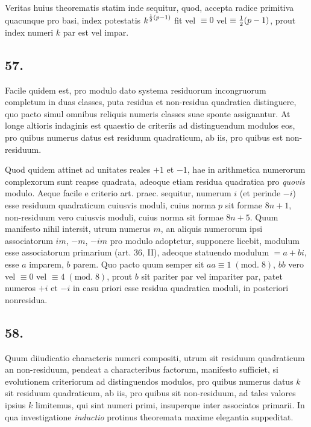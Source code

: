 \documentclass[twoside,12pt, showframe]{memoir}
\renewcommand{\pmod}[1]{\;(\textrm{mod.}\;#1)}
\let\oldfrac\frac
\def\frac#1#2{\mathchoice{\tfrac{#1}{#2}}{\oldfrac{#1}{#2}}{\genfrac{}{}{}{2}{#1}{#2\mathstrut}}{\genfrac{}{}{}{3}{#1}{#2\mathstrut}}}
\begin{document}
Veritas huius theorematis statim inde sequitur, quod, accepta radice primitiva quacunque pro basi, index potestatis \(k^{\frac{1}{2}(p-1)}\) fit vel \(\equiv 0\) vel \(\equiv \frac{1}{2}(p-1)\), prout index numeri \(k\) par est vel impar.

\subsection*{57.}
 
Facile quidem est, pro modulo dato systema residuorum incongruorum completum in duas classes, puta residua et non-residua quadratica distinguere, quo pacto simul omnibus reliquis numeris classes suae sponte assignantur. At longe altioris indaginis est quaestio de criteriis ad distinguendum modulos eos, pro quibus numerus datus est residuum quadraticum, ab iis, pro quibus est non-residuum.
 
Quod quidem attinet ad unitates reales \(+1\) et \(-1\), hae in arithmetica numerorum complexorum sunt reapse quadrata, adeoque etiam residua quadratica pro \textit{quovis} modulo. Aeque facile e criterio art. praec. sequitur, numerum \(i\) (et perinde \(-i\)) esse residuum quadraticum cuiusvis moduli, cuius norma \(p\) sit formae \(8 n+1\), non-residuum vero cuiusvis moduli, cuius norma sit formae \(8 n+5\). Quum manifesto nihil intersit, utrum numerus \(m\), an aliquis numerorum ipsi associatorum \(i m\), \(-m\), \(-i m\) pro modulo adoptetur, supponere licebit, modulum esse associatorum primarium (art. 36, II), adeoque statuendo modulum \(=a+b i\), esse \(a\) imparem, \(b\) parem. Quo pacto quum semper sit \(a a \equiv 1\pmod{8}\), \(b b\) vero vel \(\equiv 0\) vel \(\equiv 4\pmod{8}\), prout \(b\) sit pariter par vel impariter par, patet numeros \(+i\) et \(-i\) in casu priori esse residua quadratica moduli, in posteriori nonresidua.\clearpage\noindent%

\subsection*{58.}
 
Quum diiudicatio characteris numeri compositi, utrum sit residuum quadraticum an non-residuum, pendeat a characteribus factorum, manifesto sufficiet, si evolutionem criteriorum ad distinguendos modulos, pro quibus numerus datus \(k\) sit residuum quadraticum, ab iis, pro quibus sit non-residuum, ad tales valores ipsius \(k\) limitemus, qui sint numeri primi, insuperque inter associatos primarii. In qua investigatione \textit{inductio} protinus theoremata maxime elegantia suppeditat.
\end{document}
